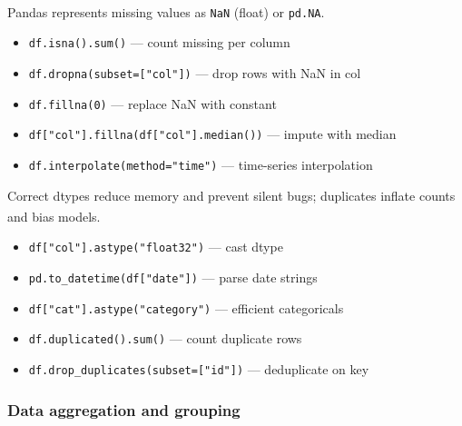 \begin{tcbitemize}[ skin=sectionraster ]
    \tcbitem[title={Handling Missing Data}, raster multicolumn=3]
    Pandas represents missing values as \texttt{NaN} (float) or \texttt{pd.NA}\textsuperscript{\cite{molinHandsonDataAnalysis2021}}.
    \tcblower
    \begin{itemize}
        \item \texttt{df.isna().sum()} --- count missing per column
        \item \texttt{df.dropna(subset=["col"])} --- drop rows with NaN in col
        \item \texttt{df.fillna(0)} --- replace NaN with constant
        \item \texttt{df["col"].fillna(df["col"].median())} --- impute with median
        \item \texttt{df.interpolate(method="time")} --- time-series interpolation
    \end{itemize}

    \tcbitem[title={Type Conversion and Duplicates}, raster multicolumn=3]
    Correct dtypes reduce memory and prevent silent bugs; duplicates inflate counts and bias models\textsuperscript{\cite{molinHandsonDataAnalysis2021}}.
    \tcblower
    \begin{itemize}
        \item \texttt{df["col"].astype("float32")} --- cast dtype
        \item \texttt{pd.to\_datetime(df["date"])} --- parse date strings
        \item \texttt{df["cat"].astype("category")} --- efficient categoricals
        \item \texttt{df.duplicated().sum()} --- count duplicate rows
        \item \texttt{df.drop\_duplicates(subset=["id"])} --- deduplicate on key
    \end{itemize}
\end{tcbitemize}

\subsubsection{Data aggregation and grouping}


